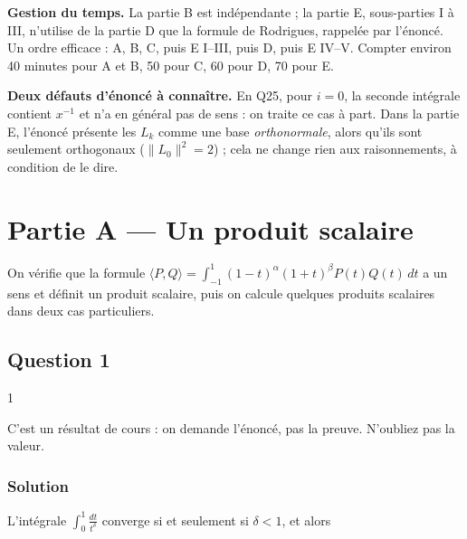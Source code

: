 \documentclass[11pt,a4paper]{article}
\newcommand{\equationajustee}[1]{%
  \sbox{\boiteequation}{$\displaystyle #1$}%
  \ifdim\wd\boiteequation>\linewidth
    \[\resizebox{\linewidth}{!}{\usebox{\boiteequation}}\]%
  \else
    \[#1\]%
  \fi}
\begin{document}
\textbf{Gestion du temps.} La partie B est indépendante ; la partie E, sous-parties I à III, n'utilise de la partie D que la formule de Rodrigues, rappelée par l'énoncé. Un ordre efficace : A, B, C, puis E I--III, puis D, puis E IV--V. Compter environ 40 minutes pour A et B, 50 pour C, 60 pour D, 70 pour E.

\textbf{Deux défauts d'énoncé à connaître.} En Q25, pour \(i=0\), la seconde intégrale contient \(x^{-1}\) et n'a en général pas de sens : on traite ce cas à part. Dans la partie E, l'énoncé présente les \(L_k\) comme une base \emph{orthonormale}, alors qu'ils sont seulement orthogonaux (\(\|L_0\|^2=2\)) ; cela ne change rien aux raisonnements, à condition de le dire.

\hypertarget{partie-a-un-produit-scalaire}{%
\section{Partie A --- Un produit scalaire}\label{partie-a-un-produit-scalaire}}

On vérifie que la formule \(\langle P,\allowbreak Q\rangle=\int_{-1}^1(1-t)^\alpha(1+t)^\beta P(t)Q(t)\,dt\) a un sens et définit un produit scalaire, puis on calcule quelques produits scalaires dans deux cas particuliers.

\hypertarget{question-1}{%
\subsection{Question 1}\label{question-1}}

\begin{indication}{1}

C'est un résultat de cours : on demande l'énoncé, pas la preuve. N'oubliez pas la valeur.

\end{indication}

\hypertarget{solution}{%
\subsubsection{Solution}\label{solution}}

L'intégrale \(\displaystyle\int_0^1\frac{dt}{t^\delta}\) converge si et seulement si \(\delta<1\), et alors

\equationajustee{\begin{aligned}\int_0^1\frac{dt}{t^\delta}&=\Big[\frac{t^{1-\delta}}{1-\delta}\Big]_0^1\\&=\frac1{1-\delta}.\end{aligned}}
\end{document}
